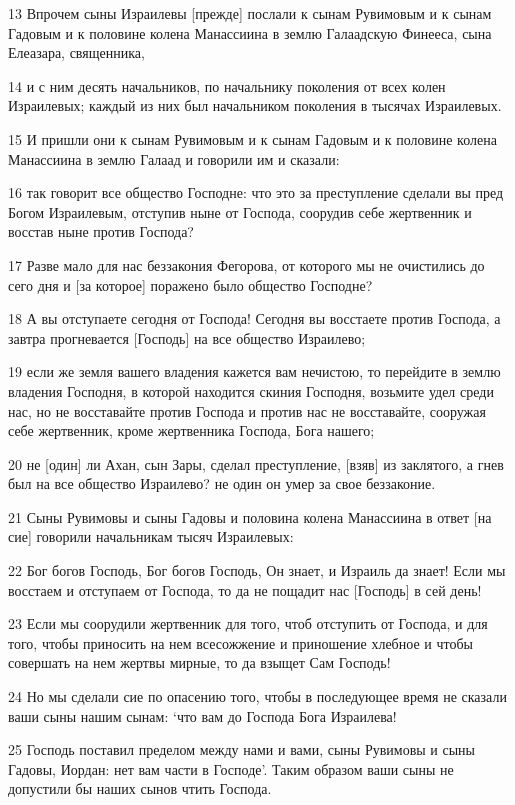 \par 13 Впрочем сыны Израилевы [прежде] послали к сынам Рувимовым и к сынам Гадовым и к половине колена Манассиина в землю Галаадскую Финееса, сына Елеазара, священника,
\par 14 и с ним десять начальников, по начальнику поколения от всех колен Израилевых; каждый из них был начальником поколения в тысячах Израилевых.
\par 15 И пришли они к сынам Рувимовым и к сынам Гадовым и к половине колена Манассиина в землю Галаад и говорили им и сказали:
\par 16 так говорит все общество Господне: что это за преступление сделали вы пред Богом Израилевым, отступив ныне от Господа, соорудив себе жертвенник и восстав ныне против Господа?
\par 17 Разве мало для нас беззакония Фегорова, от которого мы не очистились до сего дня и [за которое] поражено было общество Господне?
\par 18 А вы отступаете сегодня от Господа! Сегодня вы восстаете против Господа, а завтра прогневается [Господь] на все общество Израилево;
\par 19 если же земля вашего владения кажется вам нечистою, то перейдите в землю владения Господня, в которой находится скиния Господня, возьмите удел среди нас, но не восставайте против Господа и против нас не восставайте, сооружая себе жертвенник, кроме жертвенника Господа, Бога нашего;
\par 20 не [один] ли Ахан, сын Зары, сделал преступление, [взяв] из заклятого, а гнев был на все общество Израилево? не один он умер за свое беззаконие.
\par 21 Сыны Рувимовы и сыны Гадовы и половина колена Манассиина в ответ [на сие] говорили начальникам тысяч Израилевых:
\par 22 Бог богов Господь, Бог богов Господь, Он знает, и Израиль да знает! Если мы восстаем и отступаем от Господа, то да не пощадит нас [Господь] в сей день!
\par 23 Если мы соорудили жертвенник для того, чтоб отступить от Господа, и для того, чтобы приносить на нем всесожжение и приношение хлебное и чтобы совершать на нем жертвы мирные, то да взыщет Сам Господь!
\par 24 Но мы сделали сие по опасению того, чтобы в последующее время не сказали ваши сыны нашим сынам: `что вам до Господа Бога Израилева!
\par 25 Господь поставил пределом между нами и вами, сыны Рувимовы и сыны Гадовы, Иордан: нет вам части в Господе'. Таким образом ваши сыны не допустили бы наших сынов чтить Господа.
